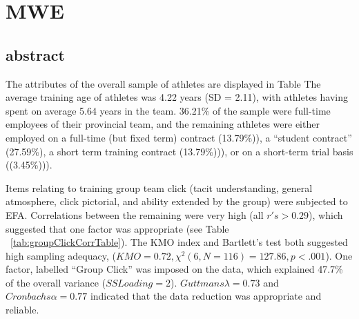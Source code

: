 \chapter{\label{testMWE}MWE}



\section{abstract}


The attributes of the overall sample of athletes are displayed in Table  The average training age of athletes was 4.22 years (SD = 2.11), with athletes having spent on average 5.64 years in the team. 36.21\% of the sample were full-time employees of their provincial team, and the remaining athletes were either employed on a full-time (but fixed term) contract
(13.79\%)), a ``student contract'' (27.59\%), a short term training contract (13.79\%))), or on a short-term trial basis ((3.45\%))).




Items relating to training group team click (tacit understanding, general atmosphere, click pictorial, and ability extended by the group) were subjected to EFA.  Correlations between the remaining were very high (all $r's > 0.29$), which suggested that one factor was appropriate (see Table ~\ref{tab:groupClickCorrTable}). The KMO index and Bartlett's test both suggested high sampling adequacy, ($KMO =  0.72, \chi^2(6, N = 116) = 127.86, p < .001$). One factor, labelled ``Group Click'' was imposed on the data, which explained 47.7\% of the overall variance ($SS Loading = 2$). $Guttmans \lambda = 0.73$ and $Cronbachs \alpha = 0.77$ indicated that the data reduction was appropriate and reliable.
